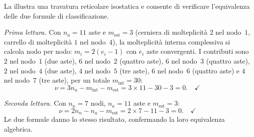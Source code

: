 La  illustra una travatura
reticolare isostatica e consente di verificare
l'equivalenza delle due formule di classificazione.

\noindent\textit{Prima lettura.}
Con $n_a = 11$ aste e $m_{\text{est}} = 3$
(cerniera di molteplicità $2$ nel nodo~$1$,
carrello di molteplicità $1$ nel nodo~$4$),
la molteplicità interna complessiva si calcola
nodo per nodo: $m_i = 2(e_i - 1)$ con $e_i$
aste convergenti. I contributi sono $2$ nel
nodo~$1$ (due aste), $6$ nel nodo~$2$ (quattro
aste), $6$ nel nodo~$3$ (quattro aste), $2$ nel
nodo~$4$ (due aste), $4$ nel nodo~$5$ (tre aste),
$6$ nel nodo~$6$ (quattro aste) e $4$ nel
nodo~$7$ (tre aste), per un totale
$m_{\text{int}} = 30$:
\[
\nu = 3n_a - m_{\text{int}} - m_{\text{est}}
= 3 \times 11 - 30 - 3 = 0. \quad\checkmark
\]

\noindent\textit{Seconda lettura.}
Con $n_n = 7$ nodi, $n_a = 11$ aste e
$m_{\text{est}} = 3$:
\[
\nu = 2n_n - n_a - m_{\text{est}}
= 2 \times 7 - 11 - 3 = 0. \quad\checkmark
\]
Le due formule danno lo stesso risultato,
confermando la loro equivalenza algebrica.



